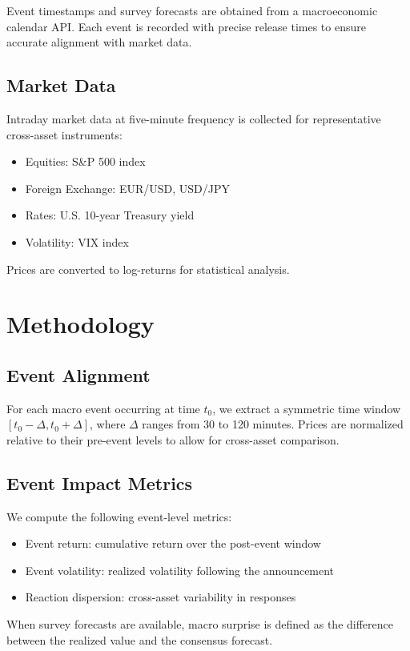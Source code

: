 \documentclass[11pt]{article}
\begin{document}
Event timestamps and survey forecasts are obtained from a macroeconomic calendar API.
Each event is recorded with precise release times to ensure accurate alignment
with market data.

\subsection{Market Data}
Intraday market data at five-minute frequency is collected for representative
cross-asset instruments:
\begin{itemize}
    \item Equities: S\&P 500 index
    \item Foreign Exchange: EUR/USD, USD/JPY
    \item Rates: U.S. 10-year Treasury yield
    \item Volatility: VIX index
\end{itemize}

Prices are converted to log-returns for statistical analysis.

\section{Methodology}

\subsection{Event Alignment}
For each macro event occurring at time $t_0$, we extract a symmetric time window
$[t_0 - \Delta, t_0 + \Delta]$, where $\Delta$ ranges from 30 to 120 minutes.
Prices are normalized relative to their pre-event levels to allow for
cross-asset comparison.

\subsection{Event Impact Metrics}
We compute the following event-level metrics:
\begin{itemize}
    \item Event return: cumulative return over the post-event window
    \item Event volatility: realized volatility following the announcement
    \item Reaction dispersion: cross-asset variability in responses
\end{itemize}

When survey forecasts are available, macro surprise is defined as the difference
between the realized value and the consensus forecast.
\end{document}
